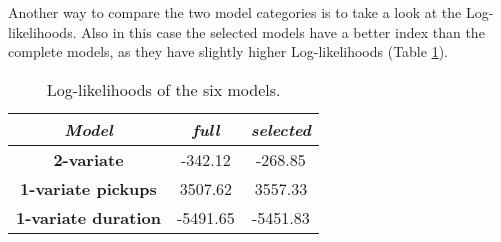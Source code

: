 \noindent
Another way to compare the two model categories is to take a look at the Log-likelihoods. Also in this case the selected models have a better index than the complete models, as they have slightly higher Log-likelihoods (Table \ref{Log-likelihoods HDGM}). 

\begin{table}[h!]
	\centering
	\renewcommand\arraystretch{1.3}
	\begin{tabular}{c|c|c}
		\hline
		\textit{Model} &\textit{full } & \textit{selected} \\ 
		\hline
		\textbf{2-variate } & -342.12  & -268.85    \\ 
		\hline
		\textbf{1-variate pickups } & 3507.62  & 3557.33    \\ 
		\hline
		\textbf{1-variate duration} & -5491.65  & -5451.83   \\ 
		\hline
	\end{tabular}
	\caption[Log-likelihoods of the six models (HDGM)]{Log-likelihoods of the six models.}
	\label{Log-likelihoods HDGM}
\end{table}
